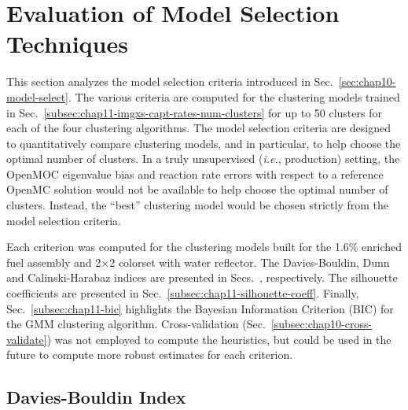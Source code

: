 \clearpage


\section{Evaluation of Model Selection Techniques}
\label{sec:chap11-model-select}

This section analyzes the model selection criteria introduced in Sec.~\ref{sec:chap10-model-select}. The various criteria are computed for the clustering models trained in Sec.~\ref{subsec:chap11-imgxs-capt-rates-num-clusters} for up to 50 clusters for each of the four clustering algorithms. The model selection criteria are designed to quantitatively compare clustering models, and in particular, to help choose the optimal number of clusters. In a truly unsupervised (\textit{i.e.}, production) setting, the OpenMOC eigenvalue bias and reaction rate errors with respect to a reference OpenMC solution would not be available to help choose the optimal number of clusters. Instead, the ``best'' clustering model would be chosen strictly from the model selection criteria.

Each criterion was computed for the clustering models built for the 1.6\% enriched fuel assembly and 2$\times$2 colorset with water reflector. The Davies-Bouldin, Dunn and Calinski-Harabaz indices are presented in Secs.~, respectively. The silhouette coefficients are presented in Sec.~\ref{subsec:chap11-silhouette-coeff}. Finally, Sec.~\ref{subsec:chap11-bic} highlights the Bayesian Information Criterion (BIC) for the \ac{GMM} clustering algorithm. Cross-validation (Sec.~\ref{subsec:chap10-cross-validate}) was not employed to compute the heuristics, but could be used in the future to compute more robust estimates for each criterion.	


\subsection{Davies-Bouldin Index}
\label{subsec:chap11-db-index}

